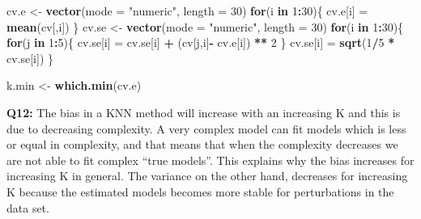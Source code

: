 \documentclass[]{article}
\newenvironment{Shaded}{\begin{snugshade}}{\end{snugshade}}
\newcommand{\KeywordTok}[1]{\textcolor[rgb]{0.13,0.29,0.53}{\textbf{#1}}}
\newcommand{\DataTypeTok}[1]{\textcolor[rgb]{0.13,0.29,0.53}{#1}}
\newcommand{\DecValTok}[1]{\textcolor[rgb]{0.00,0.00,0.81}{#1}}
\newcommand{\StringTok}[1]{\textcolor[rgb]{0.31,0.60,0.02}{#1}}
\newcommand{\ControlFlowTok}[1]{\textcolor[rgb]{0.13,0.29,0.53}{\textbf{#1}}}
\newcommand{\OperatorTok}[1]{\textcolor[rgb]{0.81,0.36,0.00}{\textbf{#1}}}
\newcommand{\NormalTok}[1]{#1}
\begin{document}
\begin{Shaded}
\begin{Highlighting}[]
\NormalTok{cv.e <-}\StringTok{ }\KeywordTok{vector}\NormalTok{(}\DataTypeTok{mode =} \StringTok{"numeric"}\NormalTok{, }\DataTypeTok{length =} \DecValTok{30}\NormalTok{)}
\ControlFlowTok{for}\NormalTok{(i }\ControlFlowTok{in} \DecValTok{1}\OperatorTok{:}\DecValTok{30}\NormalTok{)\{}
\NormalTok{  cv.e[i] =}\StringTok{ }\KeywordTok{mean}\NormalTok{(cv[,i])}
\NormalTok{\}}
\NormalTok{cv.se <-}\StringTok{ }\KeywordTok{vector}\NormalTok{(}\DataTypeTok{mode =} \StringTok{"numeric"}\NormalTok{, }\DataTypeTok{length =} \DecValTok{30}\NormalTok{)}
\ControlFlowTok{for}\NormalTok{(i }\ControlFlowTok{in} \DecValTok{1}\OperatorTok{:}\DecValTok{30}\NormalTok{)\{}
  \ControlFlowTok{for}\NormalTok{(j }\ControlFlowTok{in} \DecValTok{1}\OperatorTok{:}\DecValTok{5}\NormalTok{)\{}
\NormalTok{    cv.se[i] =}\StringTok{ }\NormalTok{cv.se[i] }\OperatorTok{+}\StringTok{ }\NormalTok{(cv[j,i]}\OperatorTok{-}\StringTok{ }\NormalTok{cv.e[i]) }\OperatorTok{**}\StringTok{ }\DecValTok{2}
\NormalTok{  \}}
\NormalTok{  cv.se[i] =}\StringTok{ }\KeywordTok{sqrt}\NormalTok{(}\DecValTok{1}\OperatorTok{/}\DecValTok{5} \OperatorTok{*}\StringTok{ }\NormalTok{cv.se[i])}
\NormalTok{\}}

\NormalTok{k.min <-}\StringTok{ }\KeywordTok{which.min}\NormalTok{(cv.e)}
\end{Highlighting}
\end{Shaded}

\textbf{Q12:} The bias in a KNN method will increase with an increasing
K and this is due to decreasing complexity. A very complex model can fit
models which is less or equal in complexity, and that means that when
the complexity decreases we are not able to fit complex ``true models''.
This explains why the bias increases for increasing K in general. The
variance on the other hand, decreases for increasing K because the
estimated models becomes more stable for perturbations in the data set.
\end{document}
